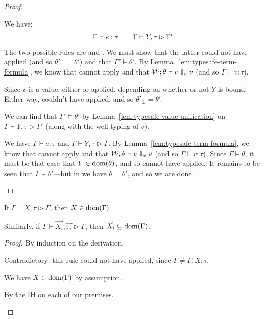 \documentclass[acmsmall,screen,nonacm]{acmart}
\theoremstyle{definition}
\begin{document}
\begin{lemma}
\begin{proof}
\begin{proofcases}
  \item[(\rn{$P$-Eq-FB})] We have:
%
  \[ \begin{array}{c}
    \Gamma \vdash e : \tau \quad\quad
    \Gamma \vdash Y, \tau \rhd \Gamma'
  \end{array} \]
%
  The two possible rules are  and . We must
  show that the latter could not have applied (and so $\theta'_\bot
  = \theta'$) and that $\Gamma' \models \theta'$.
%
  By Lemma~\ref{lem:typesafe-term-formula}, we know that 
  cannot apply and that $\mathcal{W}; \theta \vdash e \Downarrow_e v$ (and so
  $\Gamma \vdash v : \tau$).

  Since $v$ is a value, either  or  applied,
  depending on whether or not $Y$ is bound. Either way, 
  couldn't have applied, and so $\theta'_\bot = \theta'$.

  We can find that $\Gamma' \models \theta'$ by
  Lemma~\ref{lem:typesafe-value-unification} on $\Gamma \vdash
  Y, \tau \rhd \Gamma'$ (along with the well typing of $v$).

  \item[(\rn{$P$-NegEq})] We have $\Gamma \vdash e : \tau$ and $\Gamma
    \vdash Y, \tau \rhd \Gamma$.
%
    By Lemma~\ref{lem:typesafe-term-formula}, we know that
     cannot apply and that $\mathcal{W}; \theta \vdash e
    \Downarrow_e v$ (and so $\Gamma \vdash v : \tau$).
%    
  Since $\Gamma \models \theta$, it must be that case that $Y \in
  \mathrm{dom}(\theta)$, and so  cannot have applied.
%
  It remains to be seen that $\Gamma \models \theta'$---but
  in  we have $\theta = \theta'$, and so we are done.
%
  \qedhere

\end{proofcases}
\end{proof}
\end{lemma}

\begin{lemma}
\label{lem:bind-contain}
  If $\Gamma \vdash X,\tau \rhd \Gamma$, then $X \in \mathrm{dom}(\Gamma)$.

  Similarly, if $\Gamma \vdash \vec{X_i},\vec{\tau_i} \rhd \Gamma$,
  then $\vec{X_i} \subseteq \mathrm{dom}(\Gamma)$.
%
\begin{proof}
  By induction on the derivation.
%
\begin{proofcases}

  \item[(\rn{$X\tau$-Bind})] Contradictory: this rule could not have
  applied, since $\Gamma \ne \Gamma,X:\tau$.
       
  \item[(\rn{$X\tau$-Check})] We have $X \in \mathrm{dom}(\Gamma)$ by
  assumption.
  
  \item[(\rn{$\vec{X}\vec{\tau}$-All})] By the IH on each of our
  premises. 
%
  \qedhere
       
\end{proofcases}
\end{proof}
\end{lemma}
\end{document}
